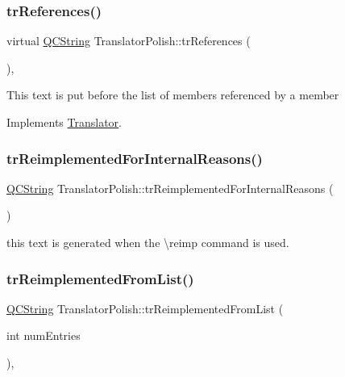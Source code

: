 \subsubsection{\texorpdfstring{trReferences()}{trReferences()}}
{\footnotesize\ttfamily virtual \mbox{\hyperlink{class_q_c_string}{Q\+C\+String}} Translator\+Polish\+::tr\+References (\begin{DoxyParamCaption}{ }\end{DoxyParamCaption})\hspace{0.3cm}{\ttfamily [inline]}, {\ttfamily [virtual]}}

This text is put before the list of members referenced by a member 

Implements \mbox{\hyperlink{class_translator}{Translator}}.

\mbox{\label{class_translator_polish_a53c90cda5eeb567fafc0d620c9b30d03}} 
\subsubsection{\texorpdfstring{trReimplementedForInternalReasons()}{trReimplementedForInternalReasons()}}
{\footnotesize\ttfamily \mbox{\hyperlink{class_q_c_string}{Q\+C\+String}} Translator\+Polish\+::tr\+Reimplemented\+For\+Internal\+Reasons (\begin{DoxyParamCaption}{ }\end{DoxyParamCaption})\hspace{0.3cm}{\ttfamily [inline]}}

this text is generated when the \textbackslash{}reimp command is used. \mbox{\label{class_translator_polish_ad0b200adbf810f8fb14c57d7a7a504e9}} 
\subsubsection{\texorpdfstring{trReimplementedFromList()}{trReimplementedFromList()}}
{\footnotesize\ttfamily \mbox{\hyperlink{class_q_c_string}{Q\+C\+String}} Translator\+Polish\+::tr\+Reimplemented\+From\+List (\begin{DoxyParamCaption}\item[{int}]{num\+Entries }\end{DoxyParamCaption})\hspace{0.3cm}{\ttfamily [inline]}, {\ttfamily [virtual]}}

